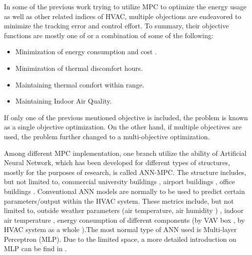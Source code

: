 \documentclass[conference]{IEEEtran}
\begin{document}
In some of the previous work trying to utilize MPC to optimize the energy usage as well as other related indices of HVAC, multiple objections are endeavored to minimize the tracking error and control effort. To summary, their objective functions are mostly one of or a combination of some of the following:
\begin{itemize}
\item Minimization of energy consumption and cost \cite{huang2015new,garnier2015predictive,kim2016simulation,lee2015optimal}.
\item Minimization of thermal discomfort hours\cite{asadi2014multi}.
\item Maintaining thermal comfort within range\cite{garnier2015predictive,kim2016simulation,ferreira2012neural}.
\item Maintaining Indoor Air Quality\cite{kusiak2011multi}.
\end{itemize}
If only one of the previous mentioned objective is included, the problem is known as a single objective optimization. On the other hand, if multiple objectives are used, the problem further changed to a multi-objective optimization.

Among different MPC implementation, one branch utilize the ability of Artificial Neural Network, which has been developed for different types of structures, mostly for the purposes of research, is called ANN-MPC. The structure includes, but not limited to, commercial university buildings \cite{he2014performance}, airport buildings \cite{huang2015new}, office buildings \cite{garnier2015predictive,kim2016simulation}. Conventional ANN models are normally to be used to predict certain parameters/output within the HVAC system. These metrics include, but not limited to, outside weather parameters (air temperature, air humidity \cite{ferreira2012neural,ruano2016imbpc}) , indoor air temperature \cite{ferreira2012neural,ruano2016imbpc}, energy consumption of different components (by VAV box \cite{kusiak2010modeling}, by HVAC system as a whole \cite{kusiak2014minimization}).The most normal type of ANN used is Multi-layer Perceptron (MLP). Due to the limited space, a more detailed introduction on MLP can be find in \cite{afram2017artificial}.
\end{document}
